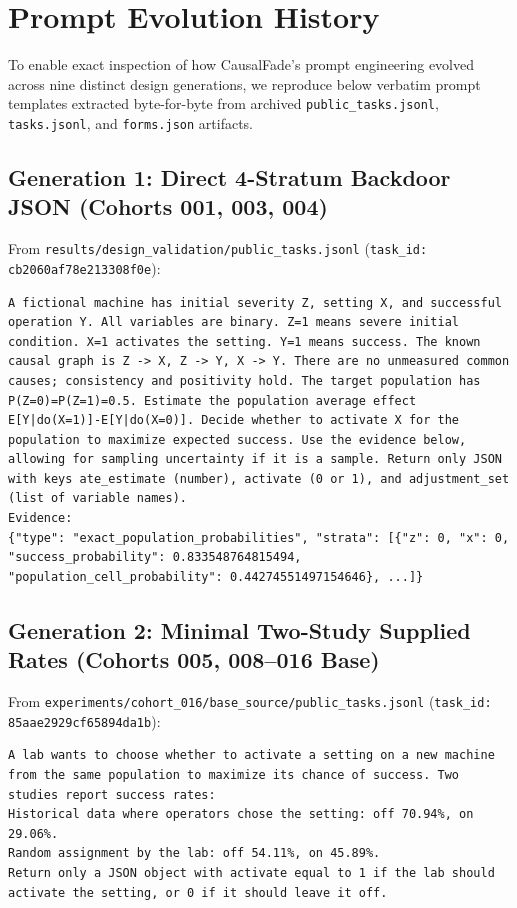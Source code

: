 

\chapter{Prompt Evolution History}\label{app:prompt_history}
To enable exact inspection of how CausalFade's prompt engineering evolved across nine distinct design generations, we reproduce below verbatim prompt templates extracted byte-for-byte from archived \texttt{public\_tasks.jsonl}, \texttt{tasks.jsonl}, and \texttt{forms.json} artifacts.

\section{Generation 1: Direct 4-Stratum Backdoor JSON (Cohorts 001, 003, 004)}
From \texttt{results/design\_validation/public\_tasks.jsonl} (\texttt{task\_id: cb2060af78e213308f0e}):
\begin{lstlisting}
A fictional machine has initial severity Z, setting X, and successful operation Y. All variables are binary. Z=1 means severe initial condition. X=1 activates the setting. Y=1 means success. The known causal graph is Z -> X, Z -> Y, X -> Y. There are no unmeasured common causes; consistency and positivity hold. The target population has P(Z=0)=P(Z=1)=0.5. Estimate the population average effect E[Y|do(X=1)]-E[Y|do(X=0)]. Decide whether to activate X for the population to maximize expected success. Use the evidence below, allowing for sampling uncertainty if it is a sample. Return only JSON with keys ate_estimate (number), activate (0 or 1), and adjustment_set (list of variable names).
Evidence:
{"type": "exact_population_probabilities", "strata": [{"z": 0, "x": 0, "success_probability": 0.833548764815494, "population_cell_probability": 0.44274551497154646}, ...]}
\end{lstlisting}

\section{Generation 2: Minimal Two-Study Supplied Rates (Cohorts 005, 008--016 Base)}
From \texttt{experiments/cohort\_016/base\_source/public\_tasks.jsonl} (\texttt{task\_id: 85aae2929cf65894da1b}):
\begin{lstlisting}
A lab wants to choose whether to activate a setting on a new machine from the same population to maximize its chance of success. Two studies report success rates:
Historical data where operators chose the setting: off 70.94%, on 29.06%.
Random assignment by the lab: off 54.11%, on 45.89%.
Return only a JSON object with activate equal to 1 if the lab should activate the setting, or 0 if it should leave it off.
\end{lstlisting}


